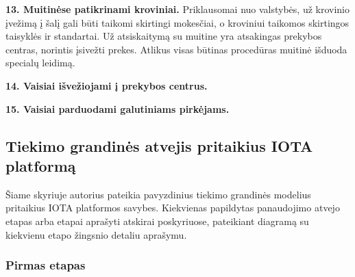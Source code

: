 \medskip \noindent \textbf{13. Muitinėse patikrinami kroviniai.} Priklausomai nuo valstybės, už krovinio įvežimą į šalį gali būti taikomi skirtingi mokesčiai, o kroviniui taikomos skirtingos taisyklės ir standartai. Už atsiskaitymą su muitine yra atsakingas prekybos centras, norintis įsivežti prekes. Atlikus visas būtinas procedūras muitinė išduoda specialų leidimą.

\medskip \noindent \textbf{14. Vaisiai išvežiojami į prekybos centrus.}

\medskip \noindent \textbf{15. Vaisiai parduodami galutiniams pirkėjams.}




\subsection{Tiekimo grandinės atvejis pritaikius IOTA platformą} \label{subsection:application-iota}

Šiame skyriuje autorius pateikia pavyzdinius tiekimo grandinės modelius pritaikius IOTA platformos savybes. Kiekvienas papildytas panaudojimo atvejo etapas arba etapai aprašyti atskirai poskyriuose, pateikiant diagramą su kiekvienu etapo žingsnio detaliu aprašymu.




\subsubsection{Pirmas etapas} \label{subsection:uc-1}

